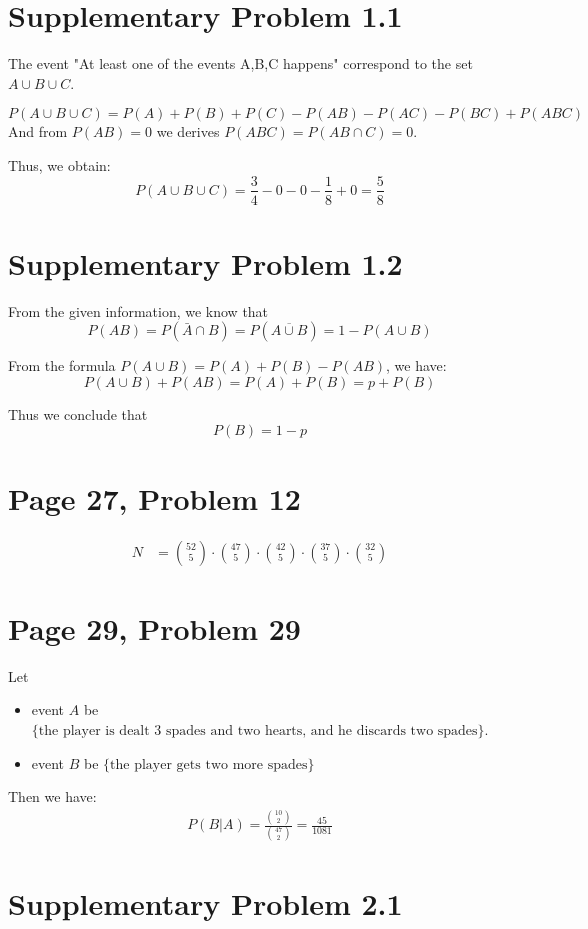 \documentclass[a4paper, UTF-8]{article}
\theoremstyle{plain}
\begin{document}
\section{Supplementary Problem 1.1}

The event "At least one of the events A,B,C happens" correspond to the set $A \cup B \cup C$.

$$
P(A \cup B \cup C) = P(A) + P(B) + P(C) - P(AB) - P(AC) - P(BC) + P(ABC)
$$
And from $P(AB) = 0$ we derives $P(ABC) = P(AB \cap C) = 0$.

Thus, we obtain:
$$
P(A \cup B \cup C) = \frac{3}{4} - 0 - 0 - \frac{1}{8} + 0 = \frac{5}{8}
$$

\section{Supplementary Problem 1.2}

From the given information, we know that 
$$
P(AB) = P(\bar{A} \cap B) = P(\overline{A \cup B}) = 1 - P(A \cup B)
$$

From the formula $P(A \cup B) = P(A) + P(B) - P(AB)$, we have:
$$
P(A \cup B) + P(AB) = P(A) + P(B) = p + P(B)
$$

Thus we conclude that 
$$
P(B) = 1 - p
$$

\section{Page 27, Problem 12}

\begin{align*}
N &= \binom{52}{5} \cdot \binom{47}{5} \cdot \binom{42}{5} \cdot \binom{37}{5} \cdot \binom{32}{5}
\end{align*}

\section{Page 29, Problem 29}
Let 
\begin{itemize}
  \item event $A$ be $\{\text{the player is dealt 3 spades and two hearts, and he discards two spades}\}$.
  \item event $B$ be $\{\text{the player gets two more spades}\}$
\end{itemize}
Then we have:
\begin{align*}
P(B|A) = \frac{\binom{10}{2}}{\binom{47}{2}} = \frac{45}{1081} 
\end{align*}

\section{Supplementary Problem 2.1}
\end{document}

